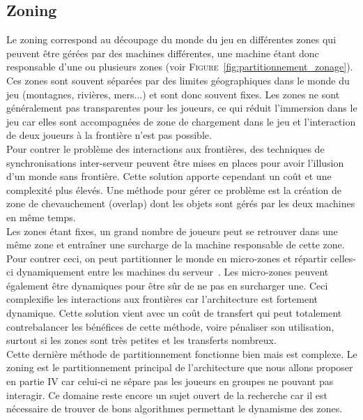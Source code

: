 \subsection{Zoning}
Le zoning correspond au découpage du monde du jeu en différentes zones qui peuvent être gérées par des machines différentes, une machine étant donc responsable d'une ou plusieurs zones (voir \textsc{Figure}~\ref{fig:partitionnement_zonage}). Ces zones sont souvent séparées par des limites géographiques dans le monde du jeu (montagnes, rivières, mers...) et sont donc souvent fixes. Les zones ne sont généralement pas transparentes pour les joueurs, ce qui réduit l'immersion dans le jeu car elles sont accompagnées de zone de chargement dans le jeu et l'interaction de deux joueurs à la frontière n'est pas possible.\\

Pour contrer le problème des interactions aux frontières, des techniques de synchronisations inter-serveur peuvent être mises en places pour avoir l'illusion d'un monde sans frontière. Cette solution apporte cependant un coût et une complexité plus élevés. Une méthode pour gérer ce problème est la création de zone de chevauchement (overlap) dont les objets sont gérés par les deux machines en même temps.\\

Les zones étant fixes, un grand nombre de joueurs peut se retrouver dans une même zone et entraîner une surcharge de la machine responsable de cette zone. Pour contrer ceci, on peut partitionner le monde en micro-zones et répartir celles-ci dynamiquement entre les machines du serveur~\cite{triangle_based_load_balancing}. Les micro-zones peuvent également être dynamiques pour être sûr de ne pas en surcharger une. Ceci complexifie les interactions aux frontières car l'architecture est fortement dynamique. Cette solution vient avec un coût de transfert qui peut totalement contrebalancer les bénéfices de cette méthode, voire pénaliser son utilisation, surtout si les zones sont très petites et les transferts nombreux.\\

Cette dernière méthode de partitionnement fonctionne bien mais est complexe. Le zoning est le partitionnement principal de l'architecture que nous allons proposer en partie IV car celui-ci ne sépare pas les joueurs en groupes ne pouvant pas interagir. Ce domaine reste encore un sujet ouvert de la recherche car il est nécessaire de trouver de bons algorithmes permettant le dynamisme des zones.


